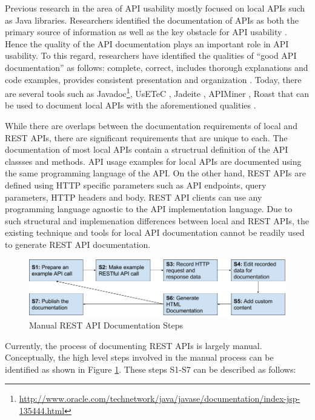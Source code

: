 Previous research in the area of API usability mostly focused on local APIs such as Java libraries. Researchers identified the documentation of APIs as both the primary source of information as well as the key obstacle for API usability \cite{Robillard_what_makes}. Hence the quality of the API documentation plays an important role in API usability. To this regard, researchers have identified the qualities of ``good API documentation'' as follows: complete, correct, includes thorough explanations and code examples, provides consistent presentation and organization \cite{Robillard_what_makes,Myers_study}. Today, there are several tools such as Javadoc\footnote{\url{http://www.oracle.com/technetwork/java/javase/documentation/index-jsp-135444.html}}, UsETeC \cite{zhu2014mining}, Jadeite \cite{Jadeite}, APIMiner \cite{montandon2013documenting}, Roast \cite{Hoffman_api_documentation} that can be used to document local APIs with the aforementioned qualities .

While there are overlaps between the documentation requirements of local and REST APIs, there are significant requirements that are unique to each. The documentation of most local APIs contain a structrual definition of the API classses and methods. API usage examples for local APIs are documented using the same programming language of the API. On the other hand, REST APIs are defined using HTTP specific parameters such as API endpoints, query parameters, HTTP headers and body. REST API clients can use any programming language agnostic to the API implementation language. Due to such structural and implemenation differences between local and REST APIs, the existing technique and tools for local API documentation cannot be readily used to generate REST API documentation.

\begin{figure}[htb]
  \includegraphics[width=\linewidth]{manual_workflow.png}
  \caption{Manual REST API Documentation Steps}
  \label{fig:manual}
\end{figure}

Currently, the process of documenting REST APIs is largely manual. Conceptually, the high level steps involved in the manual process can be identified as shown in Figure \ref{fig:manual}. These steps S1-S7 can be described as follows:

